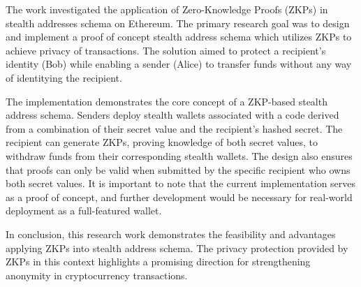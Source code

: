 \documentclass[conference,comsoc,10pt]{IEEEtran}
\begin{document}
    The work investigated the application of Zero-Knowledge Proofs (ZKPs)
    in stealth addresses schema on Ethereum. The primary research
    goal was to design and implement a proof of concept stealth address schema
    which utilizes ZKPs to achieve privacy of transactions.
    The solution aimed to protect a recipient's identity (Bob) while enabling
    a sender (Alice) to transfer funds without any way of identitying the
    recipient.

    The implementation demonstrates the core concept of a
    ZKP-based stealth address schema. Senders deploy stealth wallets
    associated with a code derived from a combination of their secret value
    and the recipient's hashed secret. The recipient can generate ZKPs,
    proving knowledge of both secret values, to withdraw funds from their
    corresponding stealth wallets. The design also ensures that proofs can
    only be valid when submitted by the specific recipient who owns both
    secret values. It is important to note that the current implementation
    serves as a proof of concept, and further development
    would be necessary for real-world deployment as a full-featured wallet. 

    In conclusion, this research work demonstrates the feasibility and
    advantages applying ZKPs into stealth address schema. The privacy
    protection provided by ZKPs in this context highlights a promising
    direction for strengthening anonymity in cryptocurrency transactions.
\end{document}
